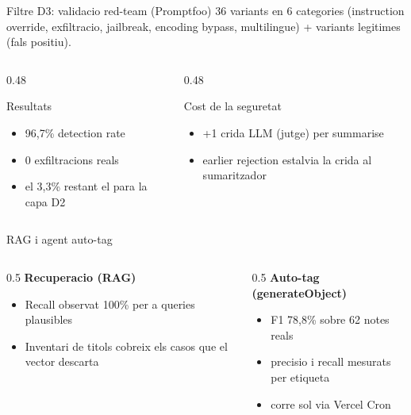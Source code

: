 \documentclass[10pt, aspectratio=169]{beamer}
\begin{document}
\begin{frame}{Filtre D3: validacio red-team (Promptfoo)}
  36 variants en 6 categories (instruction override, exfiltracio, jailbreak,
  encoding bypass, multilingue) + variants legitimes (fals positiu).
  \vfill
  \begin{columns}[c]
    \begin{column}{0.48\textwidth}
      \begin{block}{Resultats}
        \begin{itemize}
          \item \alert{96,7\%} detection rate
          \item \alert{0} exfiltracions reals
          \item el 3,3\% restant el para la capa D2
        \end{itemize}
      \end{block}
    \end{column}
    \begin{column}{0.48\textwidth}
      \begin{block}{Cost de la seguretat}
        \begin{itemize}
          \item +1 crida LLM (jutge) per summarise
          \item earlier rejection estalvia la crida al sumaritzador
        \end{itemize}
      \end{block}
    \end{column}
  \end{columns}
\end{frame}

\begin{frame}{RAG i agent auto-tag}
  \begin{columns}[T]
    \begin{column}{0.5\textwidth}
      \textbf{Recuperacio (RAG)}
      \begin{itemize}
        \item Recall observat \alert{100\%} per a queries plausibles
        \item Inventari de titols cobreix els casos que el vector descarta
      \end{itemize}
    \end{column}
    \begin{column}{0.5\textwidth}
      \textbf{Auto-tag (generateObject)}
      \begin{itemize}
        \item \alert{F1 78,8\%} sobre 62 notes reals
        \item precisio i recall mesurats per etiqueta
        \item corre sol via Vercel Cron
      \end{itemize}
    \end{column}
  \end{columns}
\end{frame}
\end{document}
